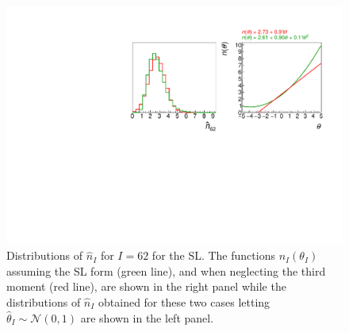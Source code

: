 \documentclass[11pt]{article}
\begin{document}
\begin{figure}[t]
  \centering
  \includegraphics[width=\textwidth]{figures/compare_62}
  \caption{Distributions of $\hat{n}_{I}$ for $I=62$ for the SL.
    The functions $n_{I}(\theta_{I})$ assuming the SL form (green line),
    and when neglecting the third moment (red line), are shown in the right panel while the distributions
    of $\hat{n}_{I}$ obtained for these two cases letting $\hat{\theta}_{I}\sim\mathcal{N}(0,1)$ are shown in the
    left panel.  }
  \label{fig:distributions}
\end{figure}





\end{document}
